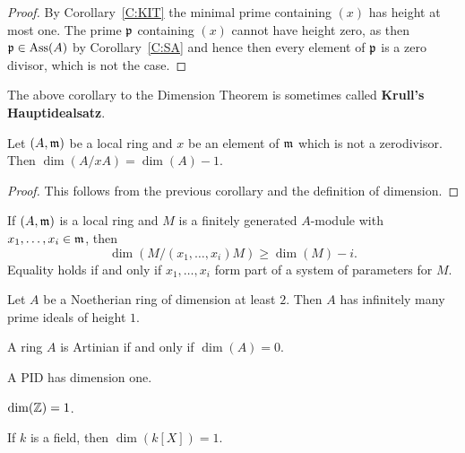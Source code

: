 \documentclass{ximera}
\begin{document}
\begin{proof} By Corollary~\ref{C:KIT} the minimal prime containing $(x)$ has height at most one. The prime $\mathfrak{p}$ containing $(x)$ cannot have height zero, as then $\mathfrak{p}\in\operatorname{Ass}(A)$ by Corollary~\ref{C:SA} and hence then every element of $\mathfrak{p}$ is a zero divisor, which is not the case.
\end{proof}

\begin{remark} The above corollary to the Dimension Theorem is sometimes called \textbf{Krull's Hauptidealsatz}.
\end{remark}

\begin{corollary}\label{C:nzdd-1} Let $(A,\mathfrak{m})$ be a local ring and $x$ be an element of $\mathfrak{m}$ which is not a zerodivisor. Then $\dim(A/xA) = \dim(A)-1$.
\end{corollary}

\begin{proof} This follows from the previous corollary and the definition of dimension.
\end{proof}


\begin{exercise} If $(A,\mathfrak{m})$ is a local ring and $M$ is a finitely generated $A$-module with $x_1,\dots,x_i\in\mathfrak{m}$, then 
\[
\dim(M/(x_1,\dots,x_i)M)\ge \dim(M) -i.
\]
Equality holds if and only if $x_1,\dots,x_i$ form part of a system of parameters for $M$.
\end{exercise}

\begin{exercise} Let $A$ be a Noetherian ring of dimension at least $2$. Then $A$ has infinitely many prime ideals of height $1$.
\end{exercise}

\begin{example} A ring $A$ is Artinian if and only if $\dim(A) = 0$. 
\end{example}

\begin{example} A PID has dimension one.
\end{example}

\begin{example} $\dim(\mathbb Z) = 1$.
\end{example}

\begin{example} If $k$ is a field, then $\dim(k[X]) = 1$.
\end{example}
\end{document}
